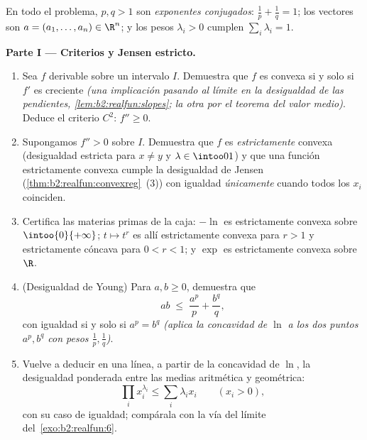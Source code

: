 \begin{problem}
\label{pb:b2:realfun:1}
En todo el problema, $p, q > 1$ son \emph{exponentes conjugados}:
$\frac1p + \frac1q = 1$; los vectores son $a = (a_1, \dots, a_n) \in
\R^n$; y los pesos $\lambda_i > 0$ cumplen $\sum_i\lambda_i = 1$.

\medskip
\noindent\textbf{Parte I --- Criterios y Jensen estricto.}
\begin{enumerate}
  \item Sea $f$ derivable sobre un intervalo $I$. Demuestra que $f$
        es convexa si y solo si $f'$ es creciente \emph{(una
        implicación pasando al límite en la desigualdad de las
        pendientes, \cref{lem:b2:realfun:slopes}; la otra por el
        teorema del valor medio)}. Deduce el criterio $C^2$: $f''
        \geq 0$.
  \item Supongamos $f'' > 0$ sobre $I$. Demuestra que $f$ es
        \emph{estrictamente} convexa (desigualdad estricta para $x
        \neq y$ y $\lambda \in \intoo01$) y que una función
        estrictamente convexa cumple la desigualdad de Jensen
        (\cref{thm:b2:realfun:convexreg}~(3)) con igualdad
        \emph{únicamente} cuando todos los $x_i$ coinciden.
  \item Certifica las materias primas de la caja: $-\ln$ es
        estrictamente convexa sobre $\intoo{0}{+\infty}$; $t \mapsto
        t^r$ es allí estrictamente convexa para $r > 1$ y
        estrictamente cóncava para $0 < r < 1$; y $\exp$ es
        estrictamente convexa sobre $\R$.
  \item (Desigualdad de Young) Para $a, b \geq 0$, demuestra que
        \[
        ab \;\leq\; \frac{a^p}{p} + \frac{b^q}{q},
        \]
        con igualdad si y solo si $a^p = b^q$ \emph{(aplica la
        concavidad de $\ln$ a los dos puntos $a^p, b^q$ con pesos
        $\frac1p, \frac1q$)}.
  \item Vuelve a deducir en una línea, a partir de la concavidad de
        $\ln$, la desigualdad ponderada entre las medias aritmética
        y geométrica:
        \[
        \prod_i x_i^{\lambda_i} \leq \sum_i\lambda_ix_i \qquad
        (x_i > 0),
        \]
        con su caso de igualdad; compárala con la vía del límite del~\cref{exo:b2:realfun:6}.
\end{enumerate}


\end{problem}
